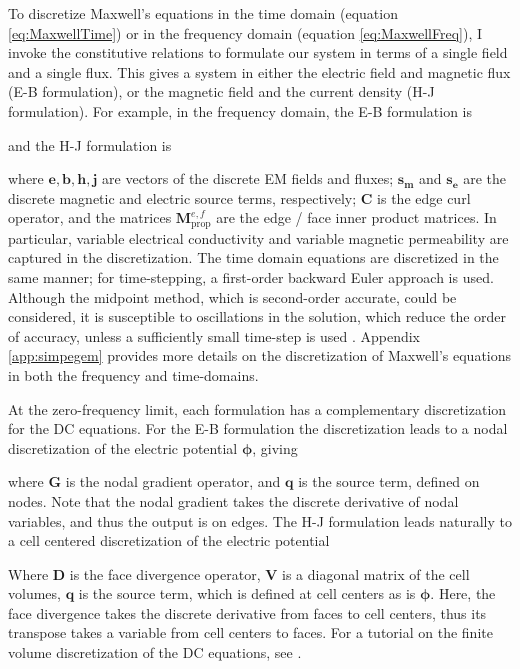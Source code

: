 

To discretize Maxwell's equations in the time domain (equation \ref{eq:MaxwellTime}) or in the frequency domain (equation \ref{eq:MaxwellFreq}), I invoke the constitutive relations to formulate our system in terms of a single field and a single flux. This gives a system in either the electric field and magnetic flux (E-B formulation), or the magnetic field and the current density (H-J formulation). For example, in the frequency domain, the E-B formulation is

and the H-J formulation is

where $\mathbf{e}, \mathbf{b}, \mathbf{h}, \mathbf{j}$ are vectors of the discrete EM fields and fluxes; $\mathbf{s_m}$ and $\mathbf{s_e}$ are the discrete magnetic and electric source terms, respectively; $\mathbf{C}$ is the edge curl operator, and the matrices $\mathbf{M}_{\text{prop}}^{e,f}$ are the edge / face inner product matrices. In particular, variable electrical conductivity and variable magnetic permeability are captured in the discretization. The time domain equations are discretized in the same manner; for time-stepping, a first-order backward Euler approach is used. Although the midpoint method, which is second-order accurate, could be considered, it is susceptible to oscillations in the solution, which reduce the order of accuracy, unless a sufficiently small time-step is used \citep{Haber2004, Haber2014}.  Appendix \ref{app:simpegem} provides more details on the discretization of Maxwell's equations in both the frequency and time-domains.

At the zero-frequency limit, each formulation has a complementary discretization for the DC equations. For the E-B formulation the discretization leads to a nodal discretization of the electric potential $\boldsymbol{\phi}$, giving

where $\mathbf{G}$ is the nodal gradient operator, and $\mathbf{q}$ is the source term, defined on nodes. Note that the nodal gradient takes the discrete derivative of nodal variables, and thus the output is on edges. The H-J formulation leads naturally to a cell centered discretization of the electric potential

Where $\mathbf{D}$ is the face divergence operator, $\mathbf{V}$ is a diagonal matrix of the cell volumes, $\mathbf{q}$ is the source term, which is  defined at cell centers as is $\boldsymbol{\phi}$. Here, the face divergence takes the discrete derivative from faces to cell centers, thus its transpose takes a variable from cell centers to faces. For a tutorial on the finite volume discretization of the DC equations, see \citep{Cockett2016}.

